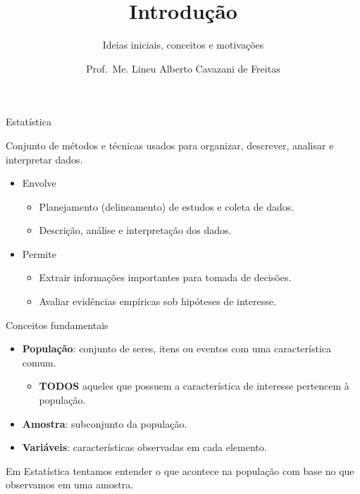 \documentclass[
  ignorenonframetext,
  serif,
  professionalfont,
  usenames,
  dvipsnames,
  aspectratio = 169]{beamer}
\title{\textbf{Introdução}}
\subtitle{Ideias iniciais, conceitos e motivações}
\author{Prof.~Me. Lineu Alberto Cavazani de Freitas}
\date{}
\institute{\textbf{CE003 – Estatística II}\\
\strut \\
Departamento de Estatística\\
Laboratório de Estatística e Geoinformação}
\providecommand{\tightlist}{%
  \setlength{\itemsep}{0pt}\setlength{\parskip}{0pt}}
\renewcommand{\tightlist}{%
  \setlength{\itemsep}{0\baselineskip}
  \setlength{\parskip}{0.25\baselineskip}
}
\begin{document}
\frame{\titlepage}

\begin{frame}{Estatística}
\protect\hypertarget{estatuxedstica}{}
\begin{block}{}
\protect\hypertarget{section}{}
Conjunto de métodos e técnicas usados para organizar, descrever,
analisar e interpretar dados.
\end{block}

\begin{itemize}
\tightlist
\item
  Envolve

  \begin{itemize}
  \tightlist
  \item
    Planejamento (delineamento) de estudos e coleta de dados.
  \item
    Descrição, análise e interpretação dos dados.
  \end{itemize}
\item
  Permite

  \begin{itemize}
  \tightlist
  \item
    Extrair informações importantes para tomada de decisões.
  \item
    Avaliar evidências empíricas sob hipóteses de interesse.
  \end{itemize}
\end{itemize}
\end{frame}

\begin{frame}{Conceitos fundamentais}
\protect\hypertarget{conceitos-fundamentais}{}
\begin{itemize}
\tightlist
\item
  \textbf{População}: conjunto de seres, itens ou eventos com uma
  característica comum.

  \begin{itemize}
  \tightlist
  \item
    \textbf{TODOS} aqueles que possuem a característica de interesse
    pertencem à população.
  \end{itemize}
\item
  \textbf{Amostra}: subconjunto da população.
\item
  \textbf{Variáveis}: características observadas em cada elemento.
\end{itemize}

Em Estatística tentamos entender o que acontece na população com base no
que observamos em uma amostra.
\end{frame}
\end{document}
